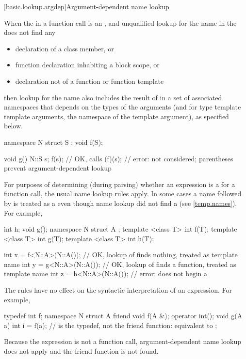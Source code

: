 [basic.lookup.argdep]{Argument-dependent name lookup}%

\pnum
When the  in
a function call is an ,
and unqualified lookup
for the name in the  does not find any
\begin{itemize}
\item
declaration of a class member, or
\item
function declaration inhabiting a block scope, or
\item
declaration not of a function or function template
\end{itemize}
then lookup for the name also includes the result of
 in a set of associated namespaces
that depends on the types of the arguments
(and for type template template arguments, the namespace of the template argument),
as specified below.
\begin{example}
\begin{codeblock}
namespace N {
  struct S { };
  void f(S);
}

void g() {
  N::S s;
  f(s);             // OK, calls 
  (f)(s);           // error:  not considered; parentheses prevent argument-dependent lookup
}
\end{codeblock}
\end{example}

\pnum
\begin{note}
For purposes of determining
(during parsing) whether an expression is a
 for a function call, the usual name lookup
rules apply.
In some cases
a name followed by \tcode{<} is treated as a 
even though name lookup did not find a 
(see \ref{temp.names}).
For example,
\begin{codeblock}
int h;
void g();
namespace N {
  struct A {};
  template <class T> int f(T);
  template <class T> int g(T);
  template <class T> int h(T);
}

int x = f<N::A>(N::A());        // OK, lookup of  finds nothing,  treated as template name
int y = g<N::A>(N::A());        // OK, lookup of  finds a function,  treated as template name
int z = h<N::A>(N::A());        // error:  does not begin a 
\end{codeblock}

The rules have no effect on the syntactic interpretation of an expression.
For example,
\begin{codeblock}
typedef int f;
namespace N {
  struct A {
    friend void f(A &);
    operator int();
    void g(A a) {
      int i = f(a);             //  is the typedef, not the friend function: equivalent to 
    }
  };
}
\end{codeblock}
Because the expression is not a function call,
argument-dependent name lookup does not apply and
the friend function  is not found.
\end{note}

